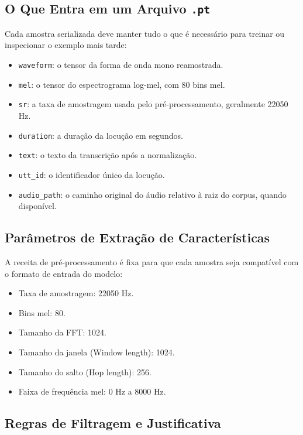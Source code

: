 \documentclass[11pt]{article}
\newcommand{\pathtt}[1]{\texttt{#1}}
\begin{document}
\subsection{O Que Entra em um Arquivo \pathtt{.pt}}

Cada amostra serializada deve manter tudo o que é necessário para treinar ou inspecionar o exemplo mais tarde:

\begin{itemize}[leftmargin=1.5em]
  \item \pathtt{waveform}: o tensor da forma de onda mono reamostrada.
  \item \pathtt{mel}: o tensor do espectrograma log-mel, com 80 bins mel.
  \item \pathtt{sr}: a taxa de amostragem usada pelo pré-processamento, geralmente 22050 Hz.
  \item \pathtt{duration}: a duração da locução em segundos.
  \item \pathtt{text}: o texto da transcrição após a normalização.
  \item \pathtt{utt\_id}: o identificador único da locução.
  \item \pathtt{audio\_path}: o caminho original do áudio relativo à raiz do corpus, quando disponível.
\end{itemize}

\subsection{Parâmetros de Extração de Características}

A receita de pré-processamento é fixa para que cada amostra seja compatível com o formato de entrada do modelo:

\begin{itemize}[leftmargin=1.5em]
  \item Taxa de amostragem: 22050 Hz.
  \item Bins mel: 80.
  \item Tamanho da FFT: 1024.
  \item Tamanho da janela (Window length): 1024.
  \item Tamanho do salto (Hop length): 256.
  \item Faixa de frequência mel: 0 Hz a 8000 Hz.
\end{itemize}

\subsection{Regras de Filtragem e Justificativa}
\end{document}
